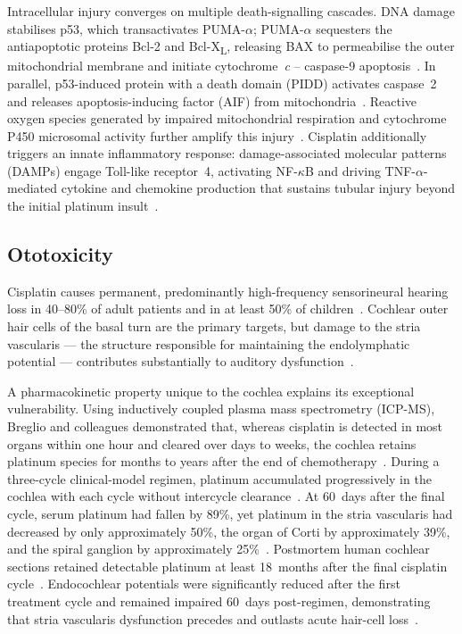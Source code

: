 \documentclass[preprint,review,12pt]{elsarticle}
\begin{document}
Intracellular injury converges on multiple death-signalling cascades. DNA damage
stabilises p53, which transactivates PUMA-$\alpha$; PUMA-$\alpha$ sequesters
the antiapoptotic proteins Bcl-2 and Bcl-X\textsubscript{L}, releasing BAX to
permeabilise the outer mitochondrial membrane and initiate cytochrome~\emph{c}
-- caspase-9 apoptosis~\cite{Pabla2008, Karasawa2015}. In parallel, p53-induced
protein with a death domain (PIDD) activates caspase~2 and releases
apoptosis-inducing factor (AIF) from mitochondria~\cite{Karasawa2015}. Reactive
oxygen species generated by impaired mitochondrial respiration and cytochrome
P450 microsomal activity further amplify this injury~\cite{Karasawa2015,
Manohar2018}. Cisplatin additionally triggers an innate inflammatory response:
damage-associated molecular patterns (DAMPs) engage Toll-like receptor~4,
activating NF-$\kappa$B and driving TNF-$\alpha$-mediated cytokine
and chemokine production that sustains tubular injury beyond the initial
platinum insult~\cite{Manohar2018}.

\subsection{Ototoxicity}

Cisplatin causes permanent, predominantly high-frequency sensorineural hearing
loss in 40--80\% of adult patients and in at least 50\% of
children~\cite{Breglio2017}. Cochlear outer hair cells of the basal turn are
the primary targets, but damage to the stria vascularis --- the structure
responsible for maintaining the endolymphatic potential --- contributes
substantially to auditory dysfunction~\cite{Breglio2017, Karasawa2015}.

A pharmacokinetic property unique to the cochlea explains its exceptional
vulnerability. Using inductively coupled plasma mass spectrometry (ICP-MS),
Breglio and colleagues demonstrated that, whereas cisplatin is detected in most
organs within one hour and cleared over days to weeks, the cochlea retains
platinum species for months to years after the end of
chemotherapy~\cite{Breglio2017}. During a three-cycle clinical-model regimen,
platinum accumulated progressively in the cochlea with each cycle without
intercycle clearance~\cite{Breglio2017}. At 60~days after the final cycle,
serum platinum had fallen by 89\%, yet platinum in the stria vascularis had
decreased by only approximately 50\%, the organ of Corti by approximately 39\%,
and the spiral ganglion by approximately 25\%~\cite{Breglio2017}. Postmortem
human cochlear sections retained detectable platinum at least 18~months after
the final cisplatin cycle~\cite{Breglio2017}. Endocochlear potentials were
significantly reduced after the first treatment cycle and remained impaired
60~days post-regimen, demonstrating that stria vascularis dysfunction precedes
and outlasts acute hair-cell loss~\cite{Breglio2017}.
\end{document}
